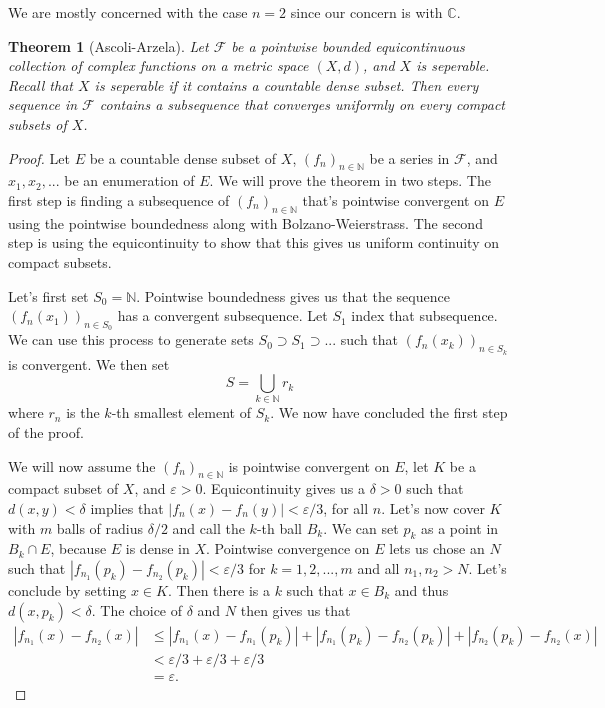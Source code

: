 \documentclass[a4paper,12pt,twoside,BCOR=10mm]{scrbook}
\newtheorem{theorem}{Theorem}[section]
\theoremstyle{definition}
\theoremstyle{definition}
\theoremstyle{definition}
\begin{document}
We are mostly concerned with the case $n = 2$ since our concern is with $\mathbb{C}$.
\begin{theorem}[Ascoli-Arzela]
Let $\mathcal{F}$ be a pointwise bounded equicontinuous collection of complex functions on a metric space $(X, d)$, and $X$ is seperable.
Recall that $X$ is seperable if it contains a countable dense subset.
Then every sequence in $\mathcal{F}$ contains a subsequence that converges uniformly on every compact subsets of $X$.
\end{theorem}
\begin{proof}
Let $E$ be a countable dense subset of $X$,
	$(f_n)_{n \in \mathbb{N}}$ be a series in $\mathcal{F}$,
	and $x_1, x_2, ...$ be an enumeration of $E$.
We will prove the theorem in two steps.
The first step is finding a subsequence of $(f_n)_{n \in \mathbb{N}}$ that's pointwise convergent on $E$ using the pointwise boundedness along with Bolzano-Weierstrass.
The second step is using the equicontinuity to show that this gives us uniform continuity on compact subsets.

Let's first set $S_0 = \mathbb{N}$.
Pointwise boundedness gives us that the sequence $(f_n(x_1))_{n \in S_0}$ has a convergent subsequence.
Let $S_1$ index that subsequence.
We can use this process to generate sets $S_0 \supset S_1 \supset ...$ such that $(f_n(x_k))_{n \in S_k}$ is convergent.
We then set
\[
	S = \bigcup_{k \in \mathbb{N}} r_k
\]
where $r_n$ is the $k$-th smallest element of $S_k$.
We now have concluded the first step of the proof.

We will now assume the $(f_n)_{n \in \mathbb{N}}$ is pointwise convergent on $E$,
	let $K$ be a compact subset of $X$, and
	$\varepsilon > 0$.
Equicontinuity gives us a $\delta > 0$ such that $d(x, y) < \delta$ implies that $|f_n(x) - f_n(y)| < \varepsilon /3$, for all $n$.
Let's now cover $K$ with $m$ balls of radius $\delta /2$ and call the $k$-th ball $B_k$.
We can set $p_k$ as a point in $B_k \cap E$, because $E$ is dense in $X$.
Pointwise convergence on $E$ lets us chose an $N$ such that $|f_{n_1}(p_k) - f_{n_2}(p_k)| < \varepsilon /3$ for $k = 1, 2, ..., m$ and all $n_1, n_2 > N$.
Let's conclude by setting $x \in K$.
Then there is a $k$ such that $x \in B_k$ and thus $d(x, p_k) < \delta$.
The choice of $\delta$ and $N$ then gives us that
\begin{align*}
	|f_{n_1}(x) - f_{n_2}(x)|
	& \leq |f_{n_1}(x) - f_{n_1}(p_k)| + |f_{n_1}(p_k) - f_{n_2}(p_k)| + |f_{n_2}(p_k) - f_{n_2}(x)|\\
	& < \varepsilon /3 + \varepsilon /3 + \varepsilon /3 \\
	& = \varepsilon.
\end{align*}
\end{proof}
\end{document}
